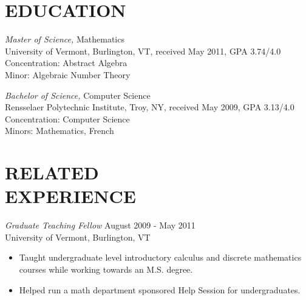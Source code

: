 \documentclass[line,margin]{res}
\begin{document}
\address{13B Franklin Street, Winooski, VT 05404}
\address{(802) 282-8205}

\begin{resume}
  
  
  \section{EDUCATION} {\sl Master of Science,} Mathematics\\
  University of Vermont, Burlington, VT, 
  received May 2011, 
  GPA 3.74/4.0\\
  Concentration: Abstract Algebra \\
  Minor: Algebraic Number Theory

  {\sl Bachelor of Science,} Computer Science \\
  Rensselaer Polytechnic Institute, Troy, NY, 
  received May 2009,
  GPA 3.13/4.0\\
  Concentration: Computer Science \\
  Minors: Mathematics, French\\

  \section{RELATED\\EXPERIENCE} 
  {\sl Graduate Teaching Fellow} \hfill August 2009 - May 2011 \\
  University of Vermont, Burlington, VT\\
  \begin{itemize}  \itemsep -2pt %
  \item
    Taught undergraduate level introductory calculus and discrete mathematics courses while working towards an M.S. degree.
  \item 
    Helped run a math department sponsored Help Session for undergraduates.
  \end{itemize}


\end{resume}
\end{document}

